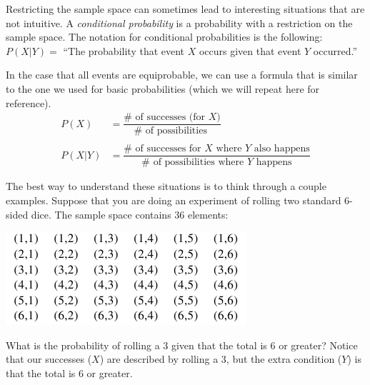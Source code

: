 \documentclass{ximera}
\begin{document}
Restricting the sample space can sometimes lead to interesting situations that are not intuitive. A \emph{conditional probability} is a probability with a restriction on the sample space. The notation for conditional probabilities is the following:
$ P(X | Y) =$ ``The probability that event $X$ occurs given that event $Y$ occurred.''

In the case that all events are equiprobable, we can use a formula that is similar to the one we used for basic probabilities (which we will repeat here for reference).
\begin{align*}
  P(X) & = \dfrac{ \# \text{ of successes (for $X$)}}{ \# \text{ of possibilities } } \\ \\
  P(X | Y) & = \dfrac{ \# \text{ of successes for $X$ where $Y$ also happens}}{ \# \text{ of possibilities where $Y$ happens}}
\end{align*}

The best way to understand these situations is to think through a couple examples. Suppose that you are doing an experiment of rolling two standard 6-sided dice. The sample space contains 36 elements:
\begin{image}
\includegraphics{ConditionalProbTable1.png}
\end{image}

What is the probability of rolling a 3 given that the total is 6 or greater? Notice that our successes ($X$) are described by rolling a 3, but the extra condition ($Y$) is that the total is 6 or greater.
\end{document}
